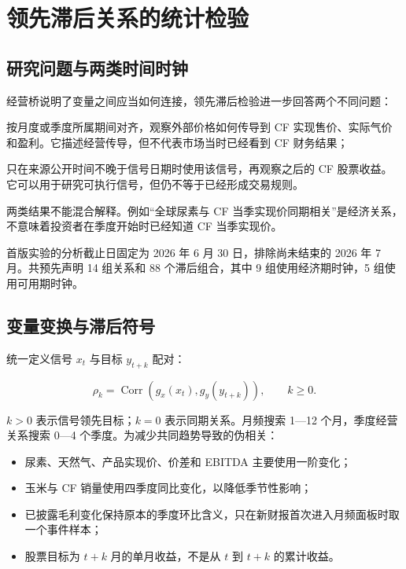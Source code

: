 \documentclass[11pt,a4paper]{ctexart}
\begin{document}
\section{领先滞后关系的统计检验}

\subsection{研究问题与两类时间时钟}

经营桥说明了变量之间应当如何连接，领先滞后检验进一步回答两个不同问题：

\begin{description}[style=nextline]
  \item[经济期时钟] 按月度或季度所属期间对齐，观察外部价格如何传导到 CF 实现售价、实际气价和盈利。它描述经营传导，但不代表市场当时已经看到 CF 财务结果；
  \item[可用期时钟] 只在来源公开时间不晚于信号日期时使用该信号，再观察之后的 CF 股票收益。它可以用于研究可执行信号，但仍不等于已经形成交易规则。
\end{description}

两类结果不能混合解释。例如“全球尿素与 CF 当季实现价同期相关”是经济关系，不意味着投资者在季度开始时已经知道 CF 当季实现价。

首版实验的分析截止日固定为 2026 年 6 月 30 日，排除尚未结束的 2026 年 7 月。共预先声明 14 组关系和 88 个滞后组合，其中 9 组使用经济期时钟，5 组使用可用期时钟。

\subsection{变量变换与滞后符号}

统一定义信号 $x_t$ 与目标 $y_{t+k}$ 配对：

\begin{equation*}
\rho_k=\operatorname{Corr}\!\left(g_x(x_t),g_y(y_{t+k})\right),
\qquad k\geq 0.
\end{equation*}

$k>0$ 表示信号领先目标；$k=0$ 表示同期关系。月频搜索 1---12 个月，季度经营关系搜索 0---4 个季度。为减少共同趋势导致的伪相关：

\begin{itemize}
  \item 尿素、天然气、产品实现价、价差和 EBITDA 主要使用一阶变化；
  \item 玉米与 CF 销量使用四季度同比变化，以降低季节性影响；
  \item 已披露毛利变化保持原本的季度环比含义，只在新财报首次进入月频面板时取一个事件样本；
  \item 股票目标为 $t+k$ 月的单月收益，不是从 $t$ 到 $t+k$ 的累计收益。
\end{itemize}
\end{document}
